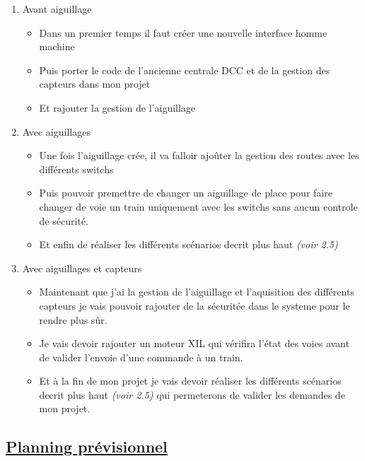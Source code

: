 \begin{enumerate}[1]
  \item Avant aiguillage
  \begin{itemize}
    \item Dans un premier temps il faut cr\'eer une nouvelle interface
      homme machine
    \item Puis porter le code de l'ancienne centrale DCC et de la
      gestion des capteurs dans mon projet
    \item Et rajouter la gestion de l'aiguillage
  \end{itemize}

  \item Avec aiguillages
  \begin{itemize}
    \item Une fois l'aiguillage cr\'ee, il va falloir ajo\^uter la
      gestion des routes avec les différents switchs
    \item Puis pouvoir premettre de changer un aiguillage de place
      pour faire changer de voie un train uniquement avec les switchs
      sans aucun controle de s\'ecurit\'e.
    \item Et enfin de r\'ealiser les diff\'erents sc\'enarios decrit
      plus haut \emph{(voir 2.5)}
  \end{itemize}

  \item Avec aiguillages et capteurs
    \begin{itemize}
      \item Maintenant que j'ai la gestion de l'aiguillage et
        l'aquisition des différents capteurs je vais pouvoir rajouter
        de la s\'ecurit\'ee dans le systeme pour le rendre plus s\^ur.
      \item Je vais devoir rajouter un moteur XIL qui v\'erifira
        l'\'etat des voies avant de valider l'envoie d'une commande \`a
        un train.
      \item Et \`a la fin de mon projet je vais devoir r\'ealiser les
        diff\'erents sc\'enarios decrit plus haut \emph{(voir 2.5)}
        qui permeterons de valider les demandes de mon projet.      
    \end{itemize}
\end{enumerate}

\newpage

\subsection{\underline{ Planning pr\'evisionnel}}
\label{sec:planning}

